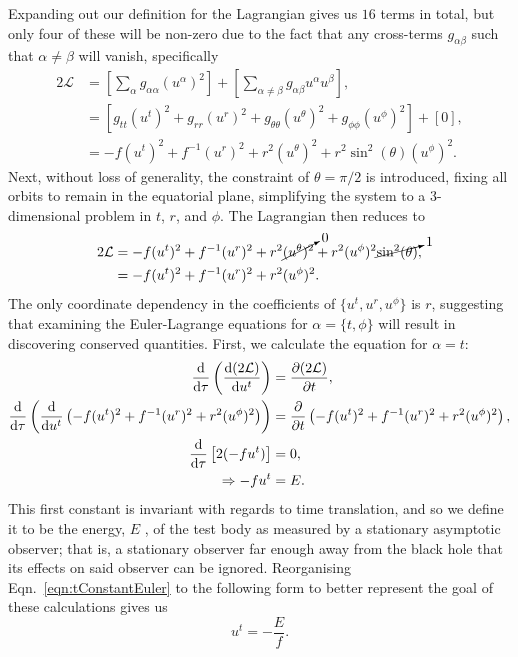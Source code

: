 Expanding out our definition for the Lagrangian gives us $16$ terms in total, but only four of these will be non-zero due to the fact that any cross-terms $g_{\alpha\beta}$ such that $\alpha \neq \beta$ will vanish, specifically
\begin{align}
    2\mathcal{L}&=\left[\sum_{\alpha}g_{\alpha\alpha}(u^\alpha)^2\right]+\left[\sum_{\alpha\neq\beta}g_{\alpha\beta}u^\alpha u^\beta\right],\\
    &=\left[g_{tt}(u^t)^2+g_{rr}(u^r)^2+g_{\theta\theta}(u^\theta)^2+g_{\phi\phi}(u^\phi)^2\right]+\left[0\right],\\
    &=-f(u^t)^2+f^{-1}(u^r)^2+r^2(u^\theta)^2+r^2\sin^2(\theta)(u^\phi)^2.
\end{align}
Next, without loss of generality, the constraint of $\theta=\pi/2$ is introduced, fixing all orbits to remain in the equatorial plane, simplifying the system to a 3-dimensional problem in $t$, $r$, and $\phi$.
The Lagrangian then reduces to
\begin{align}
2\mathcal{L}&=-f(u^t)^2+f^{-1}(u^r)^2+r^2\cancelto{0}{(u^\theta)^2}+r^2(u^\phi)^2\cancelto{1}{\sin^2(\theta)},\\
&=-f(u^t)^2+f^{-1}(u^r)^2+r^2(u^\phi)^2 \label{eqn:reduclagran}.
\end{align}
The only coordinate dependency in the coefficients of $\{u^t, u^r, u^\phi\}$ is $r$, suggesting that examining the Euler-Lagrange equations for $\alpha=\{t,\phi\}$ will result in discovering conserved quantities.
First, we calculate the equation for $\alpha=t$:
\begin{align}
    \dv{}{\tau}\left(\dv{(2\mathcal{L})}{u^t} \right)&=\pdv{(2\mathcal{L})}{t},\\
    \dv{}{\tau}\left(\dv{}{u^t}\left( -f(u^t)^2+f^{-1}(u^r)^2+r^2(u^\phi)^2\right) \right)&=\pdv{}{t}\left( -f(u^t)^2+f^{-1}(u^r)^2+r^2(u^\phi)^2\right),\\
    \dv{}{\tau}\left[2(-fu^t) \right]&=0,\\
    \Rightarrow -fu^t&=E. \label{eqn:tConstantEuler}
\end{align}
This first constant is invariant with regards to time translation, and so we define it to be the energy, $E$ \cite{introCondensed}, of the test body as measured by a stationary asymptotic observer; that is, a stationary observer far enough away from the black hole that its effects on said observer can be ignored.
Reorganising Eqn.~\eqref{eqn:tConstantEuler} to the following form to better represent the goal of these calculations gives us
\begin{equation}\label{eqn:ut}
u^t=-\frac{E}{f}.
\end{equation}
